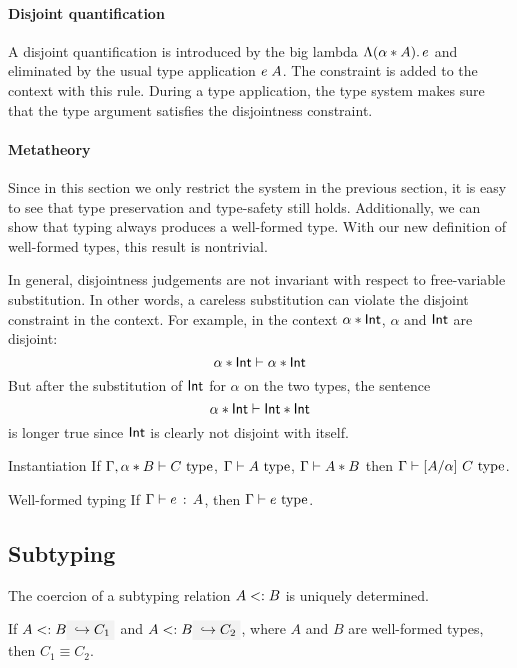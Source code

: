 \paragraph{Disjoint quantification} A disjoint quantification is introduced by
the big lambda $\Lambda (\alpha * A).\, e$ and eliminated by the usual type
application $e \; A$. The constraint is added to the context with this rule.
During a type application, the type system makes sure that the type argument
satisfies the disjointness constraint.

\paragraph{Metatheory} Since in this section we only restrict the system in the
previous section, it is easy to see that type preservation and type-safety still
holds. Additionally, we can show that typing always produces a well-formed type.
With our new definition of well-formed types, this result is nontrivial.

In general, disjointness judgements are not invariant with respect to
free-variable substitution. In other words, a careless substitution can violate
the disjoint constraint in the context. For example, in the context $\alpha
* \textsf{Int}$, $\alpha$ and $\textsf{Int}$ are disjoint:
\[ \alpha * \textsf{Int} \vdash \alpha * \textsf{Int} \]
But after the substitution of $\textsf{Int}$ for $\alpha$ on the two types, the sentence
\[ \alpha * \textsf{Int} \vdash \textsf{Int} * \textsf{Int} \]
is longer true since $\textsf{Int}$ is clearly not disjoint with itself.

\begin{lemma}{Instantiation} \label{instantiation}
  If $\Gamma, \alpha * B \vdash C \ \text{type}$, $\Gamma \vdash A \ \text{type}$, $\Gamma \vdash A * B$ then $\Gamma \vdash \lbrack A / \alpha \rbrack~ C \ \text{type}$.
\end{lemma}

\begin{lemma}{Well-formed typing} \label{wf-typing}
If $\Gamma \vdash e \ \!:\! \ A$, then $\Gamma \vdash e \ \text{type}$.
\end{lemma}

\subsection{Subtyping}

The coercion of a subtyping relation $A <: B$ is uniquely determined.

\begin{lemma} \label{unique-coercion}
  If $A \subtype B \yields {C_1}$ and $A \subtype B \yields {C_2}$, where $A$
  and $B$ are well-formed types, then $C_1 \equiv C_2$.
\end{lemma}

